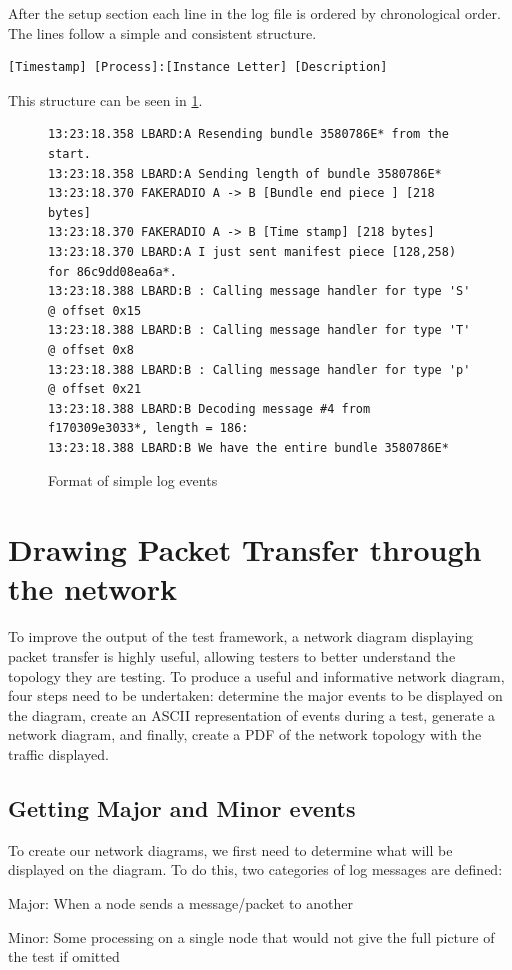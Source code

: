 After the setup section each line in the log file is ordered by chronological order. 
The lines follow a simple and consistent structure.
\begin{center}
    \begin{lstlisting}[basicstyle=\small, breaklines]
[Timestamp] [Process]:[Instance Letter] [Description]
    \end{lstlisting}
\end{center}

This structure can be seen in \figurename{ \ref{fig:chapter5SimpleLogFormat}}.
\begin{figure}
    \begin{centering}
\begin{lstlisting}[basicstyle=\small, breaklines, frame=single]
13:23:18.358 LBARD:A Resending bundle 3580786E* from the start.
13:23:18.358 LBARD:A Sending length of bundle 3580786E* 
13:23:18.370 FAKERADIO A -> B [Bundle end piece ] [218 bytes]
13:23:18.370 FAKERADIO A -> B [Time stamp] [218 bytes]
13:23:18.370 LBARD:A I just sent manifest piece [128,258) for 86c9dd08ea6a*.
13:23:18.388 LBARD:B : Calling message handler for type 'S' @ offset 0x15
13:23:18.388 LBARD:B : Calling message handler for type 'T' @ offset 0x8
13:23:18.388 LBARD:B : Calling message handler for type 'p' @ offset 0x21
13:23:18.388 LBARD:B Decoding message #4 from f170309e3033*, length = 186:
13:23:18.388 LBARD:B We have the entire bundle 3580786E*    
\end{lstlisting}
        \caption{Format of simple log events}
        \label{fig:chapter5SimpleLogFormat}
    \end{centering}
\end{figure}


\section{Drawing Packet Transfer through the network}
To improve the output of the test framework, a network diagram displaying packet transfer is highly useful, allowing testers to better understand the topology they are testing. To produce a useful and informative network diagram, four steps need to be undertaken: determine the major events to be displayed on the diagram, create an ASCII representation of events during a test, generate a network diagram, and finally, create a PDF of the network topology with the traffic displayed.


\subsection{Getting Major and Minor events}
To create our network diagrams, we first need to determine what will be displayed on the diagram.
To do this, two categories of log messages are defined: 
\begin{list}{}{}
    \item Major: When a node sends a message/packet to another
    \item Minor: Some processing on a single node that would not give the full picture of the test if omitted
\end{list}


